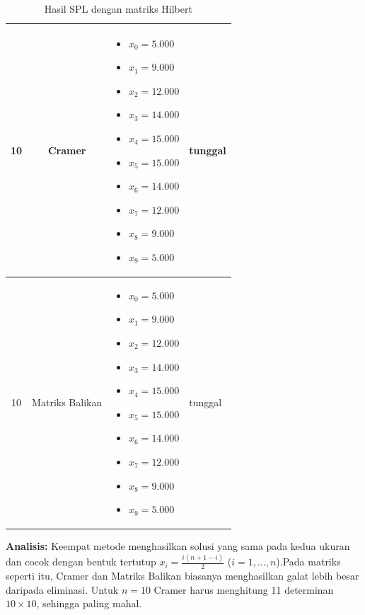 \documentclass[12pt,a4paper]{report}
\begin{document}
\begin{table}[H]
    \centering
    \caption{Hasil SPL dengan matriks Hilbert}
    \begin{tabular}{|c|c|p{5cm}|l|}
        \hline
        10 & Cramer & 
        \begin{itemize}
            \item $x_0 = 5.000$
            \item $x_1 = 9.000$
            \item $x_2 = 12.000$
            \item $x_3 = 14.000$
            \item $x_4 = 15.000$
            \item $x_5 = 15.000$
            \item $x_6 = 14.000$
            \item $x_7 = 12.000$
            \item $x_8 = 9.000$
            \item $x_9 = 5.000$
        \end{itemize}
        & tunggal \\
        \hline
        10 & Matriks Balikan & 
        \begin{itemize}
            \item $x_0 = 5.000$
            \item $x_1 = 9.000$
            \item $x_2 = 12.000$
            \item $x_3 = 14.000$
            \item $x_4 = 15.000$
            \item $x_5 = 15.000$
            \item $x_6 = 14.000$
            \item $x_7 = 12.000$
            \item $x_8 = 9.000$
            \item $x_9 = 5.000$
        \end{itemize}
        & tunggal \\
        \hline
    \end{tabular}
\end{table}
 
\textbf{Analisis:} Keempat metode menghasilkan solusi yang sama pada kedua ukuran dan cocok dengan bentuk tertutup $x_i = \tfrac{i(n+1-i)}{2}$ ($i=1,\dots,n$).Pada matriks seperti itu, Cramer dan Matriks Balikan biasanya menghasilkan galat lebih besar daripada eliminasi. Untuk $n=10$ Cramer harus menghitung 11 determinan $10\times10$, sehingga paling mahal.
\end{document}
